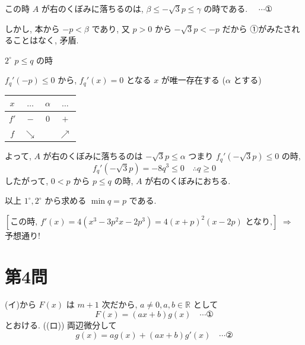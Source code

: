 \documentclass[../main.tex]{subfiles}
\begin{document}
\noindent
この時 $A$ が右のくぼみに落ちるのは, $\beta \le -\sqrt{3}p \le \gamma$ の時である. $\quad \cdots \text{①}$

\noindent
しかし, 本から $-p < \beta$ であり, 又 $p > 0$ から $-\sqrt{3}p < -p$ だから ①がみたされることはなく, 矛盾.

\bigskip
\noindent
$2^\circ$ $p \le q$ の時

$f_q'(-p) \le 0$ から, $f_q'(x) = 0$ となる $x$ が唯一存在する ($\alpha$ とする)

\begin{center}
  \begin{tabular}{c|c|c|c}
    $x$ & $\dots$ & $\alpha$ & $\dots$ \\ \hline
    $f'$ & $-$ & $0$ & $+$ \\ \hline
    $f$ & $\searrow$ & & $\nearrow$
  \end{tabular}
\end{center}

\noindent
よって, $A$ が右のくぼみに落ちるのは $-\sqrt{3}p \le \alpha$ つまり $f_q'(-\sqrt{3}p) \le 0$ の時,
\[
  f_q'(-\sqrt{3}p) = -8q^3 \le 0 \quad \therefore q \ge 0
\]
したがって, $0 < p$ から $p \le q$ の時, $A$ が右のくぼみにおちる.

\noindent
以上 $1^\circ, 2^\circ$ から求める $\min q = p$ である.

\begin{center}
\end{center}
\noindent
$\left[\text{この時, } f'(x) = 4(x^3 - 3p^2 x - 2p^3) = 4(x+p)^2 (x-2p) \text{ となり,}\right]$ $\Rightarrow$ 予想通り!

\newpage

\section*{第4問}

\noindent
[\textbf{解}] (イ)から $F(x)$ は $m+1$ 次だから, $a \neq 0, a, b \in \mathbb{R}$ として
\begin{equation}
  F(x) = (ax+b) g(x) \quad \cdots \text{①}
\end{equation}
とおける. ((ロ)) 両辺微分して
\begin{equation}
  g(x) = a g(x) + (ax+b) g'(x) \quad \cdots \text{②}
\end{equation}
\end{document}

